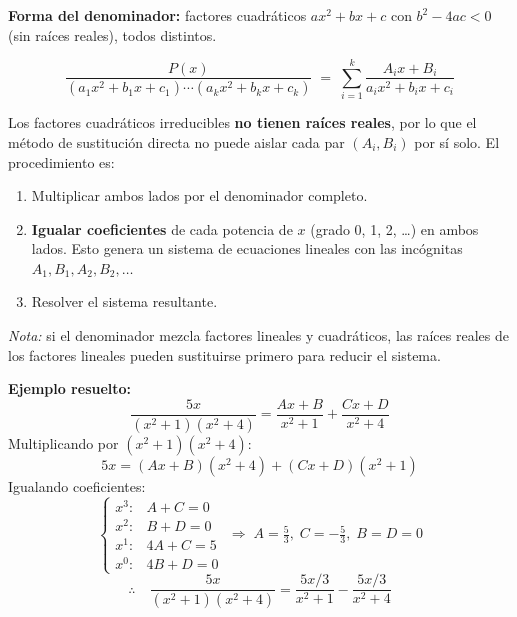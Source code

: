 \documentclass[12pt, letterpaper]{article}
\newenvironment{caso3}{%
  \begin{tcolorbox}[casobase, colframe=ambar, colbacktitle=ambarclaro, coltitle=ambartitulo,
    title=Caso 3 \textnormal{---} Factores cuadr\'{a}ticos irreducibles distintos]
}{\end{tcolorbox}}
\newenvironment{metodocuadro}[1]{%
  \begin{tcolorbox}[subcuadro, colback=coralclaro, colframe=coral,
    coltitle=coraltitulo, colbacktitle=coralclaro,
    title={#1}]
}{\end{tcolorbox}}
\begin{document}
\vspace{0.4cm}

\begin{caso3}

\textbf{Forma del denominador:} factores cuadr\'{a}ticos $ax^2+bx+c$ con $b^2-4ac < 0$
(sin ra\'{i}ces reales), todos distintos.

\[
  \frac{P(x)}{(a_1x^2+b_1x+c_1)\cdots(a_kx^2+b_kx+c_k)}
  \;=\; \sum_{i=1}^{k} \frac{A_i x + B_i}{a_i x^2 + b_i x + c_i}
\]

\begin{metodocuadro}{C\'{o}mo hallar las constantes --- Caso 3}
Los factores cuadr\'{a}ticos irreducibles \textbf{no tienen ra\'{i}ces reales}, por lo que
el m\'{e}todo de sustituci\'{o}n directa no puede aislar cada par $(A_i, B_i)$ por s\'{i} solo.
El procedimiento es:

\begin{enumerate}[leftmargin=2em, label=\arabic*.]
  \item Multiplicar ambos lados por el denominador completo.
  \item \textbf{Igualar coeficientes} de cada potencia de $x$ (grado 0, 1, 2, \ldots) en
        ambos lados. Esto genera un sistema de ecuaciones lineales con las inc\'{o}gnitas
        $A_1, B_1, A_2, B_2, \ldots$
  \item Resolver el sistema resultante.
\end{enumerate}

\textit{Nota:} si el denominador mezcla factores lineales y cuadr\'{a}ticos, las ra\'{i}ces
reales de los factores lineales pueden sustituirse primero para reducir el sistema.
\end{metodocuadro}

\medskip
\textbf{Ejemplo resuelto:}
\[
  \frac{5x}{(x^2+1)(x^2+4)} = \frac{Ax+B}{x^2+1} + \frac{Cx+D}{x^2+4}
\]
Multiplicando por $(x^2+1)(x^2+4)$:
\[
  5x = (Ax+B)(x^2+4) + (Cx+D)(x^2+1)
\]
Igualando coeficientes:
\[
  \begin{cases}
    x^3\!\!: & A + C = 0 \\
    x^2\!\!: & B + D = 0 \\
    x^1\!\!: & 4A + C = 5 \\
    x^0\!\!: & 4B + D = 0
  \end{cases}
  \;\Rightarrow\;
  A = \tfrac{5}{3},\; C = -\tfrac{5}{3},\; B = D = 0
\]
\[
  \therefore\quad \frac{5x}{(x^2+1)(x^2+4)} = \frac{5x/3}{x^2+1} - \frac{5x/3}{x^2+4}
\]

\end{caso3}
\end{document}
